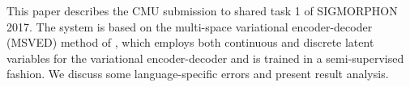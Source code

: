 This paper describes the CMU submission to shared task 1 of SIGMORPHON 2017. The system is based on the multi-space variational encoder-decoder (MSVED) method of , which employs both continuous and discrete latent variables for the variational encoder-decoder and is trained in a semi-supervised fashion. We discuss some language-specific errors and present result analysis.
